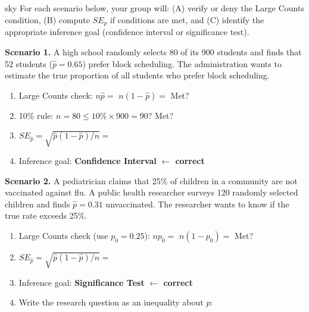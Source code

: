 \documentclass[10pt]{article}
\begin{document}
\namepartnerperiod

\vspace{0.15in}

\begin{scenariobox}{sky}
For each scenario below, your group will: (A) verify or deny the Large Counts condition,
(B) compute $SE_{\hat p}$ if conditions are met, and (C) identify the appropriate inference
goal (confidence interval or significance test).
\end{scenariobox}

\vspace{0.1in}

\textbf{Scenario 1.} A high school randomly selects 80 of its 900 students and finds that
52 students ($\hat p = 0.65$) prefer block scheduling. The administration wants to estimate
the true proportion of all students who prefer block scheduling.

\begin{enumerate}[label=\alph*.]
  \item Large Counts check: $n\hat p = $  \quad $n(1-\hat p) = $  \quad Met? 
  \item 10\% rule: $n = 80 \le 10\% \times 900 = 90$? \hfill Met? 
  \item $SE_{\hat p} = \sqrt{\hat p(1-\hat p)/n} = $ 
  \item Inference goal: \textbf{Confidence Interval} \textcolor{keyred}{\textbf{$\leftarrow$ correct}}
\end{enumerate}

\vspace{0.15in}

\textbf{Scenario 2.} A pediatrician claims that 25\% of children in a community are not
vaccinated against flu. A public health researcher surveys 120 randomly selected children
and finds $\hat p = 0.31$ unvaccinated. The researcher wants to know if the true rate
exceeds 25\%.

\begin{enumerate}[label=\alph*.]
  \item Large Counts check (use $p_0 = 0.25$): $np_0 = $  \quad $n(1-p_0) = $  \quad Met? 
  \item $SE_{\hat p} = \sqrt{\hat p(1-\hat p)/n} = $ 
  \item Inference goal: \textbf{Significance Test} \textcolor{keyred}{\textbf{$\leftarrow$ correct}}
  \item Write the research question as an inequality about $p$: 
\end{enumerate}
\end{document}
